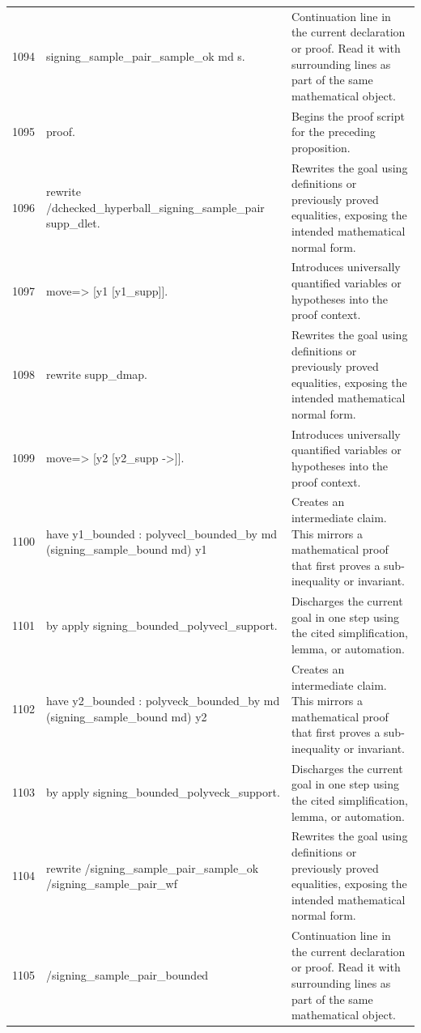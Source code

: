 \documentclass[10pt]{article}
\begin{document}
\begin{longtable}{r L{0.53\textwidth} L{0.37\textwidth}}
1094 & {\ttfamily\scriptsize   signing\_sample\_pair\_sample\_ok md s.} & Continuation line in the current declaration or proof.  Read it with surrounding lines as part of the same mathematical object. \\
1095 & {\ttfamily\scriptsize proof.} & Begins the proof script for the preceding proposition. \\
1096 & {\ttfamily\scriptsize rewrite /dchecked\_hyperball\_signing\_sample\_pair supp\_dlet.} & Rewrites the goal using definitions or previously proved equalities, exposing the intended mathematical normal form. \\
1097 & {\ttfamily\scriptsize move=> [y1 [y1\_supp]].} & Introduces universally quantified variables or hypotheses into the proof context. \\
1098 & {\ttfamily\scriptsize rewrite supp\_dmap.} & Rewrites the goal using definitions or previously proved equalities, exposing the intended mathematical normal form. \\
1099 & {\ttfamily\scriptsize move=> [y2 [y2\_supp ->]].} & Introduces universally quantified variables or hypotheses into the proof context. \\
1100 & {\ttfamily\scriptsize have y1\_bounded : polyvecl\_bounded\_by md (signing\_sample\_bound md) y1} & Creates an intermediate claim.  This mirrors a mathematical proof that first proves a sub-inequality or invariant. \\
1101 & {\ttfamily\scriptsize   by apply signing\_bounded\_polyvecl\_support.} & Discharges the current goal in one step using the cited simplification, lemma, or automation. \\
1102 & {\ttfamily\scriptsize have y2\_bounded : polyveck\_bounded\_by md (signing\_sample\_bound md) y2} & Creates an intermediate claim.  This mirrors a mathematical proof that first proves a sub-inequality or invariant. \\
1103 & {\ttfamily\scriptsize   by apply signing\_bounded\_polyveck\_support.} & Discharges the current goal in one step using the cited simplification, lemma, or automation. \\
1104 & {\ttfamily\scriptsize rewrite /signing\_sample\_pair\_sample\_ok /signing\_sample\_pair\_wf} & Rewrites the goal using definitions or previously proved equalities, exposing the intended mathematical normal form. \\
1105 & {\ttfamily\scriptsize         /signing\_sample\_pair\_bounded} & Continuation line in the current declaration or proof.  Read it with surrounding lines as part of the same mathematical object. \\

\end{longtable}
\end{document}

